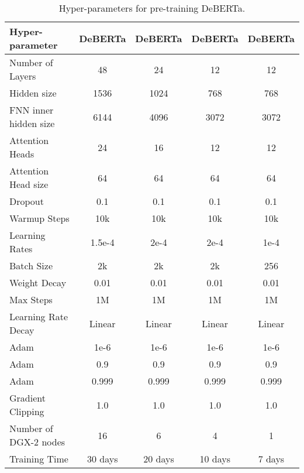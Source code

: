 \documentclass{article}
\begin{document}
\begin{table*}[htb!]
    \centering
    \begin{tabular}{@{\hskip3pt}l@{\hskip2pt}|@{\hskip2pt} c@{\hskip2pt}|@{\hskip2pt} c@{\hskip2pt}|@{\hskip2pt} c@{\hskip2pt}|@{\hskip2pt} c@{\hskip2pt}}
        \toprule
          Hyper-parameter & DeBERTa& DeBERTa &  DeBERTa &DeBERTa\\
        \midrule
        Number of Layers& 48& 24 &12 &12\\
        Hidden size&1536 &1024 &768 &768\\
        FNN inner hidden size & 6144& 4096 & 3072& 3072 \\
        Attention Heads &24 & 16 & 12 & 12\\
        Attention Head size &64 & 64 & 64& 64 \\
        Dropout & 0.1& 0.1 & 0.1& 0.1 \\
        Warmup Steps & 10k & 10k & 10k & 10k\\
        Learning Rates & 1.5e-4& 2e-4& 2e-4& 1e-4 \\
        Batch Size & 2k& 2k & 2k & 256\\
        Weight Decay & 0.01& 0.01 & 0.01& 0.01 \\
        Max Steps & 1M& 1M & 1M & 1M\\
        Learning Rate Decay & Linear& Linear & Linear& Linear \\
        Adam  & 1e-6& 1e-6 & 1e-6& 1e-6 \\
        Adam  & 0.9& 0.9 & 0.9& 0.9 \\
        Adam  & 0.999& 0.999 & 0.999& 0.999 \\
        Gradient Clipping & 1.0& 1.0 & 1.0& 1.0 \\ \hline
        Number of DGX-2 nodes & 16& 6 & 4 &1 \\
        Training Time & 30 days& 20 days & 10 days & 7 days \\
        \bottomrule
        \end{tabular}
    \caption{    Hyper-parameters for pre-training DeBERTa. }
    \label{tbl:hyper-pre-train}
\end{table*}
\end{document}
